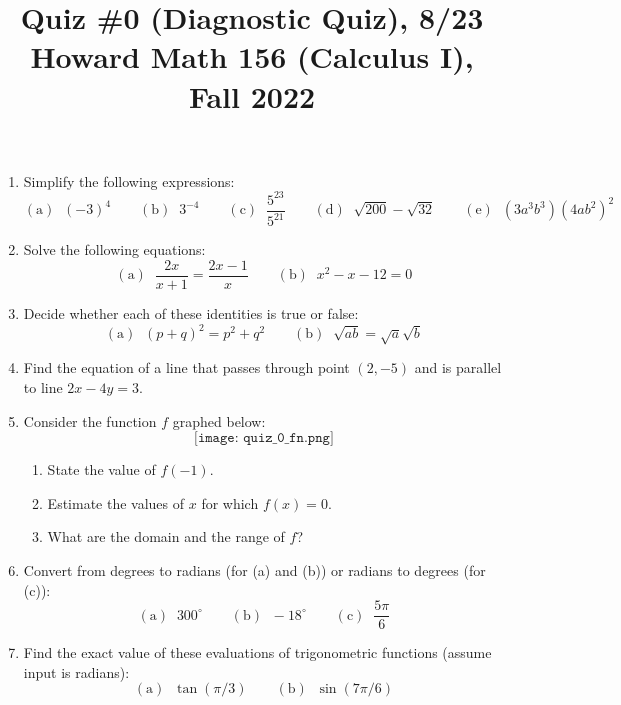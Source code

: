 \documentclass[11pt]{article}
\title{Quiz \#0 (Diagnostic Quiz), 8/23 \\Howard Math 156 (Calculus I), Fall 2022}
\date{}
\begin{document}
\maketitle

\thispagestyle{empty}

\vspace{-1cm}

\begin{enumerate}
\item Simplify the following expressions:
\[ \mathrm{(a)} \; \; (-3)^4 \qquad \mathrm{(b)} \; \; 3^{-4} \qquad \mathrm{(c)} \; \; \frac{5^{23}}{5^{21}} \qquad \mathrm{(d)} \; \; \sqrt{200}-\sqrt{32} \qquad \mathrm{(e)} \; \; (3a^3b^3)(4ab^2)^2 \]
\item Solve the following equations:
\[ \mathrm{(a)} \; \; \frac{2x}{x+1} = \frac{2x-1}{x} \qquad \mathrm{(b)} \; \; x^2 - x -12 = 0\]
\item Decide whether each of these identities is true or false:
\[ \mathrm{(a)} \; \; (p+q)^2 = p^2 + q^2 \qquad \mathrm{(b)} \; \; \sqrt{ab} = \sqrt{a}\sqrt{b}  \]
\item Find the equation of a line that passes through point $(2,-5)$ and is parallel to line $2x-4y=3$.

\item Consider the function $f$ graphed below:
\[ \texttt{[image: quiz\_0\_fn.png]} \]
\begin{enumerate}
\item State the value of $f(-1)$.
\item Estimate the values of $x$ for which $f(x)=0$.
\item What are the domain and the range of $f$?
\end{enumerate}

\item Convert from degrees to radians (for (a) and (b)) or radians to degrees (for (c)):
\[ \mathrm{(a)} \; \; 300^{\circ} \qquad \mathrm{(b)} \; \; -18^{\circ} \qquad \mathrm{(c)} \; \; \frac{5\pi}{6}\]

\item Find the exact value of these evaluations of trigonometric functions (assume input is radians):
\[ \mathrm{(a)} \; \; \tan(\pi/3) \qquad \mathrm{(b)} \; \; \sin(7\pi/6)\]

\end{enumerate}
\end{document}
